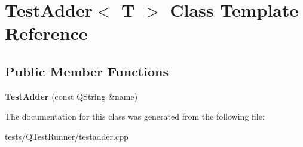 \hypertarget{classTestAdder}{}\section{Test\+Adder$<$ T $>$ Class Template Reference}
\label{classTestAdder}
\subsection*{Public Member Functions}
\begin{DoxyCompactItemize}
\item 
\hypertarget{classTestAdder_a64f9008ae27868e36acdd5c94eebae3b}{}{\bfseries Test\+Adder} (const Q\+String \&name)\label{classTestAdder_a64f9008ae27868e36acdd5c94eebae3b}

\end{DoxyCompactItemize}


The documentation for this class was generated from the following file\+:\begin{DoxyCompactItemize}
\item 
tests/\+Q\+Test\+Runner/testadder.\+cpp\end{DoxyCompactItemize}
